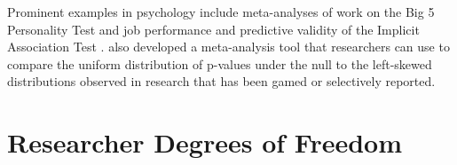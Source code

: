 \documentclass[12pt] {article}
\begin{document}
Prominent examples in psychology include meta-analyses of work on the Big 5 Personality Test and job performance \citep{barrick1991big5} and predictive validity of the Implicit Association Test \citep{greenwald2009understanding}. \cite{simonsohn2014p} also developed a meta-analysis tool that researchers can use to compare the uniform distribution of p-values under the null to the left-skewed distributions observed in research that has been gamed or selectively reported.


\section{Researcher Degrees of
Freedom}\label{rdof}
\end{document}
